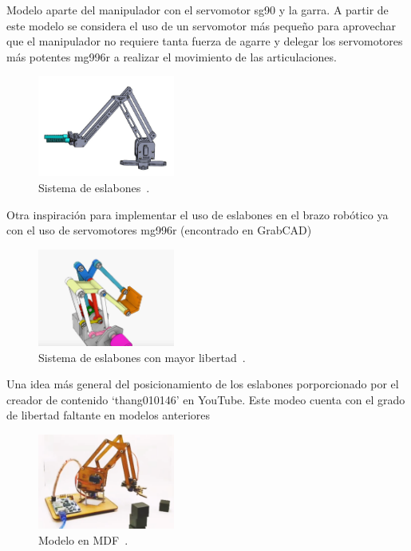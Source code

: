 \begin{multicols}{2}
Modelo aparte del manipulador con el servomotor sg90 y la garra. A partir de este modelo se considera el uso de un servomotor más pequeño para aprovechar que el manipulador no requiere tanta fuerza de agarre y delegar los servomotores más potentes mg996r a realizar el movimiento de las articulaciones. 

\begin{figure}[H]
  \centering
  \includegraphics[width=0.4\textwidth]{anexos/inspiraciones/4eslabones.png}
  \caption{Sistema de eslabones~\cite{grabcad_sea_reach_robot_arm}.}\label{fig:insp.eslabones}
\end{figure}

Otra inspiración para implementar el uso de eslabones en el brazo robótico ya con el uso de servomotores mg996r (encontrado en GrabCAD)

\begin{figure}[H]
  \centering
  \includegraphics[width=0.4\textwidth]{anexos/inspiraciones/5eslabones.png}
  \caption{Sistema de eslabones con mayor libertad~\cite{youtube_robot_arm_link}.}\label{fig:insp.eslabones2}
\end{figure}

Una idea más general del posicionamiento de los eslabones porporcionado por el creador de contenido `thang010146' en YouTube. Este modeo cuenta con el grado de libertad faltante en modelos anteriores

\begin{figure}[H]
  \centering
  \includegraphics[width=0.4\textwidth]{anexos/inspiraciones/6mdf.png}
  \caption{Modelo en MDF~\cite{youtube_robot_arm_mdf}.}\label{fig:insp.mdf}
\end{figure}


\end{multicols}
